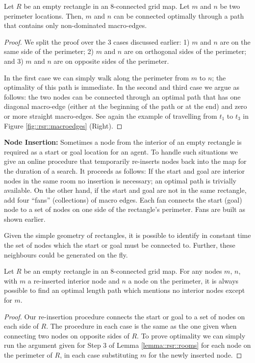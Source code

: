 \begin{lemma} \label{lemma::rsr::rooms} Let $R$ be an empty rectangle in
an 8-connected grid map. Let $m$ and $n$ be two perimeter locations.
Then, $m$ and $n$ can be connected optimally through a path that
contains only non-dominated macro-edges.
\end{lemma}

\begin{proof}
We split the proof over the 3 cases discussed earlier: 1) {$m$ and $n$ are on
the same side of the perimeter;} 2) {\label{lemma::rsr::rooms-step2}$m$ and
$n$ are on orthogonal sides of the perimeter;} and 3)
{\label{lemma::rsr::rooms-step3} $m$ and $n$ are on opposite sides of the
perimeter.}

In the first case we can simply walk along the perimeter from $m$ to $n$; the
optimality of this path is immediate. In the second and third case we argue as
follows: the two nodes can be connected through an optimal path that has one
diagonal macro-edge (either at the beginning of the path or at the end) and
zero or more straight macro-edges.  See again the example of travelling from
$t_1$ to $t_3$ in Figure
\ref{fig::rsr::macroedges} (Right).
\end{proof}

\noindent
\textbf{Node Insertion:}
Sometimes a node from the interior of an empty rectangle is required as a start
or goal location for an agent.  To handle such situations we give an online
procedure that temporarily re-inserts nodes back into the map for the duration
of a search.  It proceeds as follows: {If the start and goal are interior nodes
in the same room no insertion is necessary; an optimal path is trivially
available. } {On the other hand, if the start and goal are not in the same
rectangle, add four ``fans'' (collections) of macro edges.  Each fan connects
the start (goal) node to a set of nodes on one side of the rectangle's
perimeter.  Fans are built as shown earlier.}

Given the simple geometry of rectangles, it is possible to identify in constant
time the set of nodes which the start or goal must be connected to.  Further,
these neighbours could be generated on the fly.

\begin{lemma}
\label{lemma::rsr::insertion}
Let $R$ be an empty rectangle in an 8-connected grid map.  For any
nodes $m$, $n$, with $m$ a re-inserted interior node and $n$ a node on the
perimeter, it is always possible to find an optimal length path which mentions
no interior nodes except for $m$.
\end{lemma}
\begin{proof}
Our re-insertion procedure connects the start or goal to a set of nodes on each
side of $R$.  The procedure in each case is the same as the one given when
connecting two nodes on opposite sides of $R$.  To prove optimality we can
simply run the argument given for Step 3 of Lemma \ref{lemma::rsr::rooms} for each
node on the perimeter of $R$, in each case substituting $m$ for the newly
inserted node.
\end{proof}

